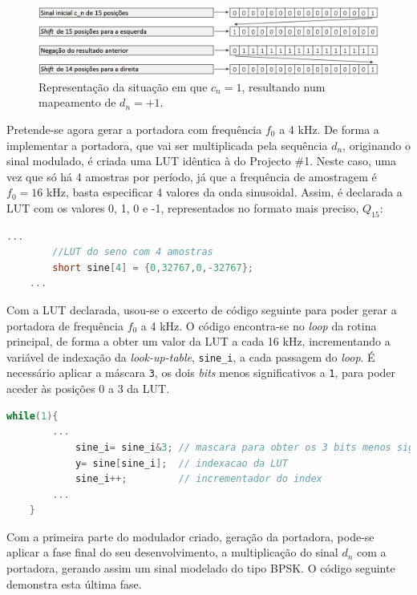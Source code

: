 \documentclass[11pt]{article}
\numberwithin{equation}{section}
\begin{document}
\begin{figure}[H]
	\centering
	\includegraphics[keepaspectratio=true, scale=0.30]{teoricas/esquema1}
	\caption{Representação da situação em que $c_{n} = 1$, resultando num mapeamento de $d_{n} = +1$.}
	\vspace{-0.8em}
\end{figure}

Pretende-se agora gerar a portadora com frequência $f_0$  a 4 kHz. De forma a implementar a portadora, que vai ser multiplicada pela sequência $d_n$, originando o sinal modulado, é criada uma LUT idêntica à do Projecto \#1. Neste caso, uma vez que só há 4 amostras por período, já que a frequência de amostragem é 
$f_0 = 16$ kHz, basta especificar 4 valores da onda sinusoidal. Assim, é declarada a LUT com os valores 0, 1, 0 e -1, representados no formato mais preciso, $Q_{15}$:

\begin{lstlisting}[language=C]
	...
		//LUT do seno com 4 amostras
		short sine[4] = {0,32767,0,-32767};
	...
\end{lstlisting}

Com a LUT declarada, usou-se o excerto de código seguinte para poder gerar a portadora de frequência $f_0$ a 4 kHz. O código encontra-se no \textit{loop} da rotina principal, de forma a obter um valor da LUT a cada 16 kHz, incrementando a variável de indexação da \textit{look-up-table}, \texttt{sine\_i}, a cada passagem do \textit{loop}. É necessário aplicar a máscara \texttt{3}, os dois \textit{bits} menos significativos a \texttt{1}, para poder aceder às posições 0 a 3 da LUT.

\begin{lstlisting}[language=C]
	while(1){	
		...
			sine_i= sine_i&3; // mascara para obter os 3 bits menos significativos
			y= sine[sine_i];  // indexacao da LUT
			sine_i++;		  // incrementador do index
		...
	}
\end{lstlisting}

Com a primeira parte do modulador criado, geração da portadora, pode-se aplicar a fase final do seu desenvolvimento, a multiplicação do sinal $d_n$ com a portadora, gerando assim um sinal modelado do tipo BPSK. O código seguinte demonstra esta última fase.  
\end{document}

